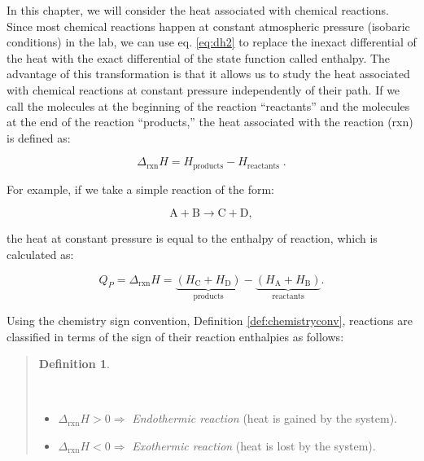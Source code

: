 \documentclass[
  9pt,
]{extbook}
\providecommand{\tightlist}{%
  \setlength{\itemsep}{0pt}\setlength{\parskip}{0pt}}
\theoremstyle{definition}
\newtheorem{definition}{Definition}[chapter]
\theoremstyle{definition}
\theoremstyle{definition}
\theoremstyle{definition}
\theoremstyle{remark}
\begin{document}
In this chapter, we will consider the heat associated with chemical reactions. Since most chemical reactions happen at constant atmospheric pressure (isobaric conditions) in the lab, we can use eq. \eqref{eq:dh2} to replace the inexact differential of the heat with the exact differential of the state function called enthalpy. The advantage of this transformation is that it allows us to study the heat associated with chemical reactions at constant pressure independently of their path. If we call the molecules at the beginning of the reaction ``reactants'' and the molecules at the end of the reaction ``products,'' the heat associated with the reaction (rxn) is defined as:

\begin{equation}
  \Delta_{\text{rxn}} H = H_{\text{products}}-H_{\text{reactants}} \; .
  \label{eq:DHrxn1}
\end{equation}

For example, if we take a simple reaction of the form:

\[ \mathrm{A} + \mathrm{B} \rightarrow \mathrm{C} + \mathrm{D}, \]

the heat at constant pressure is equal to the enthalpy of reaction, which is calculated as:

\begin{equation}
  Q_P = \Delta_{\text{rxn}} H = \underbrace{ \left (H_{\mathrm{C}}+H_{\mathrm{D}} \right) }_{\text{products}} - \underbrace{\left( H_{\mathrm{A}}+H_{\mathrm{B}}\right)}_{\text{reactants}}.
  \label{eq:DHrxn2}
\end{equation}

Using the chemistry sign convention, Definition \ref{def:chemistryconv}, reactions are classified in terms of the sign of their reaction enthalpies as follows:

\begin{quote}
\begin{definition}
\protect\hypertarget{def:exoendo}{}\label{def:exoendo}

\(\;\)

\begin{itemize}
\tightlist
\item
  \(\Delta_{\text{rxn}} H > 0 \Rightarrow\) \emph{Endothermic reaction} (heat is gained by the system).
\item
  \(\Delta_{\text{rxn}} H < 0 \Rightarrow\) \emph{Exothermic reaction} (heat is lost by the system).
\end{itemize}

\end{definition}
\end{quote}
\end{document}
